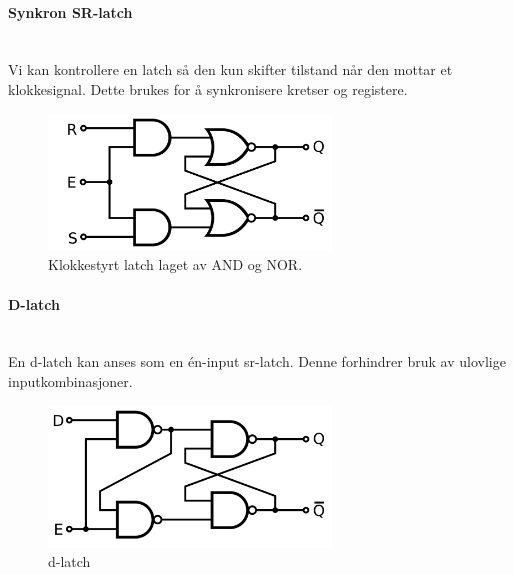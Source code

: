 \paragraph{Synkron SR-latch} \mbox{} \\
Vi kan kontrollere en latch så den kun skifter tilstand når den mottar
et klokkesignal.
Dette brukes for å synkronisere kretser og registere.
\begin{figure}[H]
  \caption{Klokkestyrt latch laget av AND og NOR.}
  \centering
  \includegraphics[width=0.67\textwidth]{./img/klokket-sr}
\end{figure}



\paragraph{D-latch} \mbox{} \\
En d-latch kan anses som en én-input sr-latch.
Denne forhindrer bruk av ulovlige inputkombinasjoner.
\begin{figure}[H]
  \caption{d-latch}
  \centering
  \includegraphics[width=0.67\textwidth]{./img/klokket-dlatch}
\end{figure}
